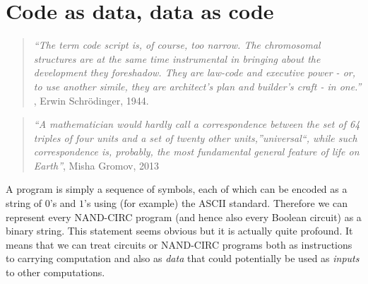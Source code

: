 \chapter{Code as data, data as code}\label{codeanddatachap}


\begin{quote}
\emph{``The term code script is, of course, too narrow. The chromosomal
structures are at the same time instrumental in bringing about the
development they foreshadow. They are law-code and executive power - or,
to use another simile, they are architect's plan and builder's craft -
in one.''} , Erwin Schrödinger, 1944.
\end{quote}

\begin{quote}
\emph{``A mathematician would hardly call a correspondence between the
set of 64 triples of four units and a set of twenty other
units,''universal``, while such correspondence is, probably, the most
fundamental general feature of life on Earth''}, Misha Gromov, 2013
\end{quote}

A program is simply a sequence of symbols, each of which can be encoded
as a string of \(0\)'s and \(1\)'s using (for example) the ASCII
standard. Therefore we can represent every NAND-CIRC program (and hence
also every Boolean circuit) as a binary string. This statement seems
obvious but it is actually quite profound. It means that we can treat
circuits or NAND-CIRC programs both as instructions to carrying
computation and also as \emph{data} that could potentially be used as
\emph{inputs} to other computations.

